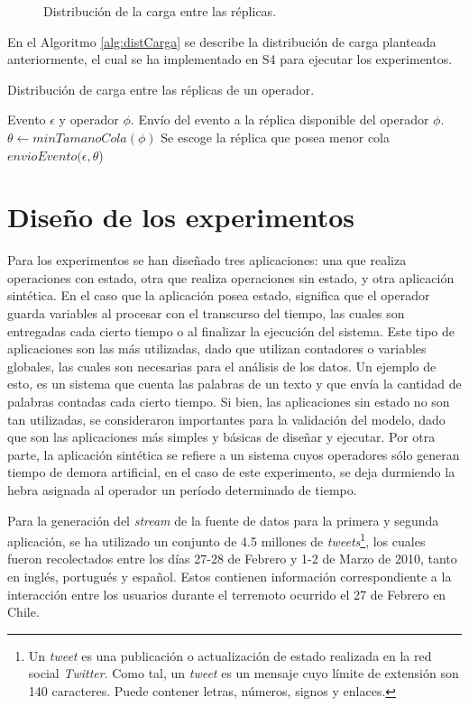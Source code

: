 \begin{figure}[!ht]
	\caption{Distribución de la carga entre las réplicas.}
	\label{fig:distCarga}
\end{figure}

En el Algoritmo \ref{alg:distCarga} se describe la distribución de carga planteada anteriormente, el cual se ha implementado en S4 para ejecutar los experimentos.

\begin{algorithm}[!ht]
	\caption{Distribución de carga entre las réplicas de un operador.}
	\label{alg:distCarga}
	\begin{algorithmic}[1]
	\REQUIRE Evento $\epsilon$ y operador $\phi$.
	\ENSURE Envío del evento a la réplica disponible del operador $\phi$.
	\STATE $\theta \leftarrow minTamanoCola(\phi)$ \COMMENT Se escoge la réplica que posea menor cola
	\STATE $envioEvento(\epsilon,\theta$)
	\end{algorithmic}
\end{algorithm}

\section{Diseño de los experimentos}
Para los experimentos se han diseñado tres aplicaciones: una que realiza operaciones con estado, otra que realiza operaciones sin estado, y otra aplicación sintética. En el caso que la aplicación posea estado, significa que el operador guarda variables al procesar con el transcurso del tiempo, las cuales son entregadas cada cierto tiempo o al finalizar la ejecución del sistema. Este tipo de aplicaciones son las más utilizadas, dado que utilizan contadores o variables globales, las cuales son necesarias para el análisis de los datos. Un ejemplo de esto, es un sistema que cuenta las palabras de un texto y que envía la cantidad de palabras contadas cada cierto tiempo. Si bien, las aplicaciones sin estado no son tan utilizadas, se consideraron importantes para la validación del modelo, dado que son las aplicaciones más simples y básicas de diseñar y ejecutar. Por otra parte, la aplicación sintética se refiere a un sistema cuyos operadores sólo generan tiempo de demora artificial, en el caso de este experimento, se deja durmiendo la hebra asignada al operador un período determinado de tiempo.

Para la generación del \textit{stream} de la fuente de datos para la primera y segunda aplicación, se ha utilizado un conjunto de 4.5 millones de \textit{tweets}\footnote{Un \textit{tweet} es una publicación o actualización de estado realizada en la red social \textit{Twitter}. Como tal, un \textit{tweet} es un mensaje cuyo límite de extensión son 140 caracteres. Puede contener letras, números, signos y enlaces.}, los cuales fueron recolectados entre los días 27-28 de Febrero y 1-2 de Marzo de 2010, tanto en inglés, portugués y español. Estos contienen información correspondiente a la interacción entre los usuarios durante el terremoto ocurrido el 27 de Febrero en Chile.

